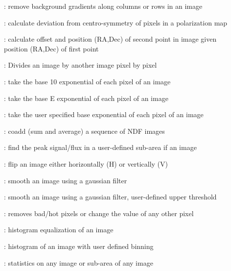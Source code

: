 \begin{description}
\item []: remove background gradients along
columns or rows in an image

\item []: calculate deviation from
centro-symmetry of pixels in a polarization map

\item []: calculate offset and position (RA,Dec) of
second point in image given position (RA,Dec) of first point

\item []: Divides an image by another image pixel by
pixel

\item []: take the base 10 exponential of each
pixel of an image

\item []: take the base E exponential of each pixel
of an image

\item []: take the user specified base
exponential of each pixel of an image

\item []: coadd (sum and average) a sequence of
NDF images

\item []: find the peak signal/flux in a
user-defined sub-area if an image

\item []: flip an image either horizontally (H) or
vertically (V)

\item []: smooth an image using a gaussian filter

\item []: smooth an image using a gaussian
filter, user-defined upper threshold

\item []: removes bad/hot pixels or change the
value of any other pixel

\item []: histogram equalization of an image

\item []: histogram of an image with user
defined binning

\item []: statistics on any image or sub-area of
any image


\end{description}
